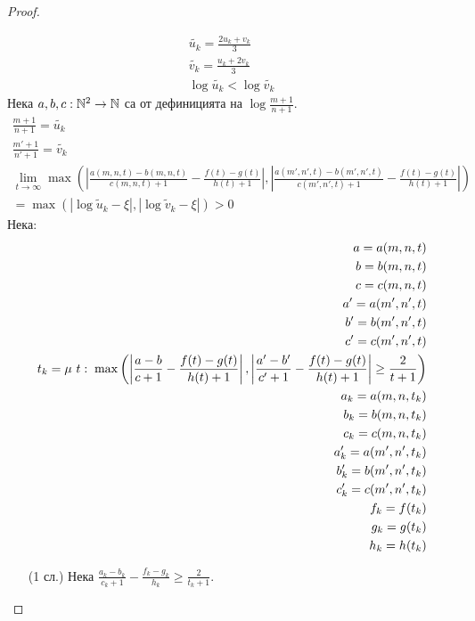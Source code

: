 \begin{proof}
\begin{itemize}
        \begin{equation}
            \begin{split}
            \tilde{u_k} = \frac{2u_k + v_k}{3} \\
            \tilde{v_k} = \frac{u_k + 2v_k}{3} \\
            \log \tilde{u_k} < \log \tilde{v_k}
            \end{split}
        \end{equation}
        Нека $a,b,c: {\mathbb{N}}^2 \to {\mathbb{N}}$ са от дефиницията на $\log \frac{m+1}{n+1}$.
        \begin{equation}
            \begin{split}
                \frac{m+1}{n+1} = \tilde{u_k} \\
                \frac{m'+1}{n'+1} = \tilde{v_k} \\
                \lim_{t\to\infty} \max \left( \left| \frac{a(m,n,t) - b(m,n,t)}{c(m,n,t) + 1} - \frac{f(t)-g(t)}{h(t) + 1} \right|, \left| \frac{a(m',n',t) - b(m',n',t)}{c(m',n',t) + 1} - \frac{f(t)-g(t)}{h(t) + 1} \right| \right) \\
                = \max (|\log \tilde u_k - \xi|, |\log \tilde v_k - \xi|) > 0
            \end{split}
        \end{equation}
        Нека:
        \begin{equation}
            \begin{split}
                a = a(m,n,t)\\
                b = b(m,n,t)\\
                c = c(m,n,t)\\
                a' = a(m',n',t)\\
                b' = b(m',n',t)\\
                c' = c(m',n',t)\\
                t_k = \mu\ t:\; \max\left(\left|\frac{a - b}{c+1} - \frac{f(t)-g(t)}{h(t)+1}\right|, \left|\frac{a' - b'}{c'+1} - \frac{f(t)-g(t)}{h(t)+1}\right| \geq \frac{2}{t+1}\right) \\
                a_k = a(m,n,t_k)\\
                b_k = b(m,n,t_k)\\
                c_k = c(m,n,t_k)\\
                a_k' = a(m',n',t_k)\\
                b_k' = b(m',n',t_k)\\
                c_k' = c(m',n',t_k)\\
                f_k = f(t_k) \\
                g_k = g(t_k) \\
                h_k = h(t_k)
            \end{split}
        \end{equation}
        \begin{itemize}
            \item[(1 сл.)] Нека $\frac{a_k - b_k}{c_k + 1} - \frac{f_k - g_k}{h_k} \geq \frac{2}{t_k+1}$.
            

\end{itemize}
\end{itemize}
\end{proof}

